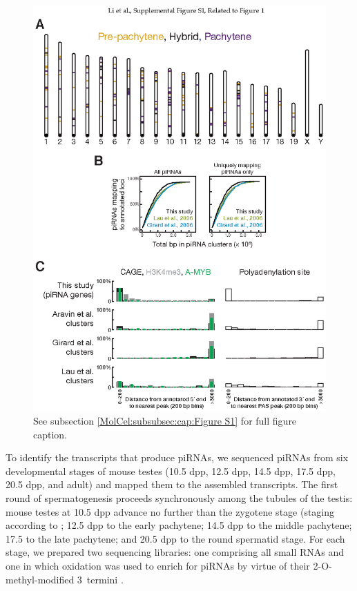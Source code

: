     \begin{figure} %
      \centering 
      \includegraphics{Figures/MolCel/MolCel2013_FigS1.eps}
      \caption[The Major piRNA-Producing Genes of the Post-Partum Mouse Testis]
      {
        See subsection \ref{MolCel:subsubsec:cap:Figure S1} for full figure caption.
        }
      \label{MolCel:fig:MolCelS1}
      \end{figure}

    To identify the transcripts that produce piRNAs, we sequenced piRNAs from six developmental stages of mouse testes (10.5 dpp, 12.5 dpp, 14.5 dpp, 17.5 dpp, 20.5 dpp, and adult) and mapped them to the assembled transcripts. The first round of spermatogenesis proceeds synchronously among the tubules of the testis: mouse testes at 10.5 dpp advance no further than the zygotene stage (staging according to \citep{NEBEL1961}; 12.5 dpp to the early pachytene; 14.5 dpp to the middle pachytene; 17.5 to the late pachytene; and 20.5 dpp to the round spermatid stage. For each stage, we prepared two sequencing libraries: one comprising all small RNAs and one in which oxidation was used to enrich for piRNAs by virtue of their 2\textprime-O-methyl-modified 3\textprime~termini \citep{Ghildiyal2008}.

